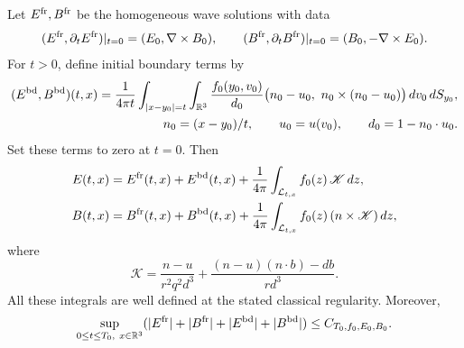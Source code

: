 \begin{proposition}\label{ret:representation}
Let $E^{\rm fr},B^{\rm fr}$ be the homogeneous wave solutions with data
\[
 (E^{\rm fr},\partial_tE^{\rm fr})|_{t=0}
       =(E_0,\nabla\times B_0),\qquad
 (B^{\rm fr},\partial_tB^{\rm fr})|_{t=0}
       =(B_0,-\nabla\times E_0).
\]
For $t>0$, define initial boundary terms by
\begin{equation}\label{ret:initial-boundary}
 \begin{split}
 (E^{\rm bd},B^{\rm bd})(t,x)
 =\frac1{4\pi t}\int_{|x-y_0|=t}\int_{\mathbb R^3}
 \frac{f_0(y_0,v_0)}{d_0}
 \bigl(n_0-u_0,\ n_0\times(n_0-u_0)\bigr)\,dv_0\,dS_{y_0},\\
 n_0=(x-y_0)/t,\qquad u_0=u(v_0),\qquad d_0=1-n_0\cdot u_0.
 \end{split}
\end{equation}
Set these terms to zero at $t=0$. Then
\begin{equation}\label{ret:fields}
 \begin{split}
 E(t,x)&=E^{\rm fr}(t,x)+E^{\rm bd}(t,x)
                  +\frac1{4\pi}\int_{\mathcal L_{t,x}}f_0(z)\,\mathscr K\,dz,\\
 B(t,x)&=B^{\rm fr}(t,x)+B^{\rm bd}(t,x)
                  +\frac1{4\pi}\int_{\mathcal L_{t,x}}f_0(z)\,(n\times\mathscr K)\,dz,
 \end{split}
\end{equation}
where
\begin{equation}\label{ret:kernel}
 \mathscr K=\frac{n-u}{r^2q^2d^3}
       +\frac{(n-u)(n\cdot b)-db}{rd^3}.
\end{equation}
All these integrals are well defined at the stated classical regularity.
Moreover,
\begin{equation}\label{ret:data-bound}
 \sup_{0\leq t\leq T_0,\ x\in\mathbb R^3}
 (|E^{\rm fr}|+|B^{\rm fr}|+|E^{\rm bd}|+|B^{\rm bd}|)
 \leq C_{T_0,f_0,E_0,B_0}.
\end{equation}
\end{proposition}

